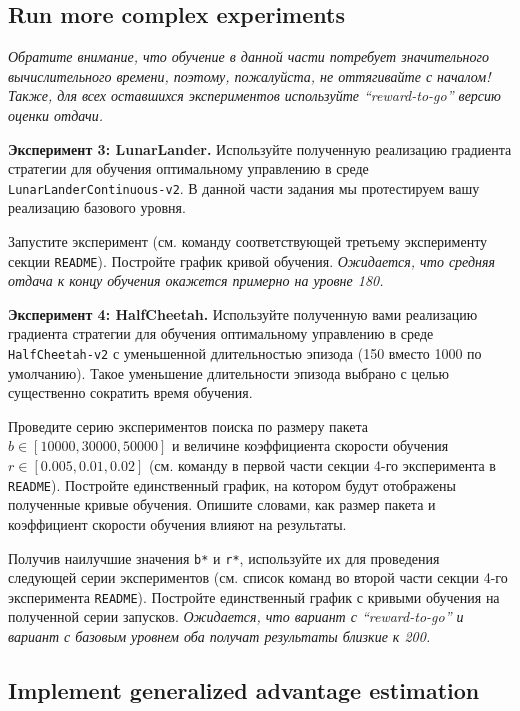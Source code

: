 \documentclass[12pt, oneside]{article}
\begin{document}
\subsection{Run more complex experiments}

\textit{Обратите внимание, что обучение в данной части потребует значительного вычислительного времени, поэтому, пожалуйста, не оттягивайте с началом! Также, для всех оставшихся экспериментов используйте ``reward-to-go'' версию оценки отдачи.}

\textbf{Эксперимент 3: LunarLander.} Используйте полученную реализацию градиента стратегии для обучения оптимальному управлению в среде \verb|LunarLanderContinuous-v2|. В данной части задания мы протестируем вашу реализацию базового уровня.

Запустите эксперимент (см. команду соответствующей  третьему эксперименту секции \verb|README|). Постройте график кривой обучения. \textit{Ожидается, что средняя отдача к концу обучения окажется примерно на уровне 180.}

\textbf{Эксперимент 4: HalfCheetah.} Используйте полученную вами реализацию градиента стратегии для обучения оптимальному управлению в среде \verb|HalfCheetah-v2| с уменьшенной длительностью эпизода (150 вместо 1000 по умолчанию). Такое уменьшение длительности эпизода выбрано с целью существенно сократить время обучения.

Проведите серию экспериментов поиска по размеру пакета $b \in [10000, 30000, 50000]$ и величине коэффициента скорости обучения $r \in [0.005, 0.01, 0.02]$ (см. команду в первой части секции 4-го эксперимента в \verb|README|). Постройте единственный график, на котором будут отображены полученные кривые обучения. Опишите словами, как размер пакета и коэффициент скорости обучения влияют на результаты.

Получив наилучшие значения \verb|b*| и \verb|r*|, используйте их для проведения следующей серии экспериментов (см. список команд во второй части секции 4-го эксперимента \verb|README|). Постройте единственный график с кривыми обучения на полученной серии запусков. \textit{Ожидается, что вариант с ``reward-to-go'' и вариант с базовым уровнем оба получат результаты близкие к 200.}

\subsection{Implement generalized advantage estimation}
\end{document}
